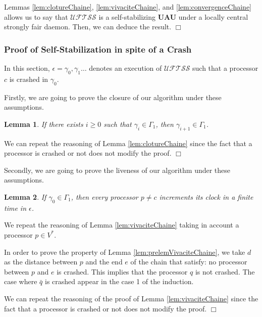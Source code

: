 \documentclass[11pt,english,letterpaper]{article}
\newtheorem{lemma}{Lemma}
\newenvironment{proof}{{\noindent\bf Proof. } }{{\hfill $\Box$}}
\begin{document}
\begin{proof}
Lemmas \ref{lem:clotureChaine}, \ref{lem:vivaciteChaine}, and \ref{lem:convergenceChaine} allows us to say that $\mathcal{UFTSS}$ is a self-stabilizing \textbf{UAU} under a locally central strongly fair daemon. Then, we can deduce the result.
\end{proof}

\subsubsection{Proof of Self-Stabilization in spite of a Crash}
	
In this section, $\epsilon=\gamma_{0},\gamma_{1}\ldots$ denotes an execution of $\mathcal{UFTSS}$ such that a processor $c$ is crashed in $\gamma_{0}$.

Firstly, we are going to prove the closure of our algorithm under these assumptions.

\begin{lemma}\label{lem:clotureCrashChaine}
If there exists $i\geq 0$ such that $\gamma_{i}\in \Gamma_{1}$, then $\gamma_{i+1}\in\Gamma_{1}$.
\end{lemma}

\begin{proof}
We can repeat the reasoning of Lemma \ref{lem:clotureChaine} since the fact that a processor is crashed or not does not modify the proof.
\end{proof}

Secondly, we are going to prove the liveness of our algorithm under these assumptions.

\begin{lemma}\label{lem:vivaciteCrashChaine}
If $\gamma_{0}\in\Gamma_{1}$, then every processor $p\neq c$ increments its clock in a finite time in $\epsilon$.
\end{lemma}

\begin{proof}
We repeat the reasoning of Lemma \ref{lem:vivaciteChaine} taking in account a processor $p\in V^{*}$.

In order to prove the property of Lemma \ref{lem:prelemVivaciteChaine}, we take $d$ as the distance between $p$ and the end $e$ of the chain that satisfy: no processor between $p$ and $e$ is crashed. This implies that the processor $q$ is not crashed. The case where $\bar{q}$ is crashed appear in the case 1 of the induction.

We can repeat the reasoning of the proof of Lemma \ref{lem:vivaciteChaine} since the fact that a processor is crashed or not does not modify the proof.
\end{proof}
			
\end{document}
